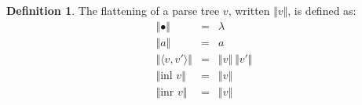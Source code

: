 \documentclass[oneside,12pt]{scrbook}
\theoremstyle{definition}
\theoremstyle{plain}
\theoremstyle{definition}
\newtheorem{Definition}{Definition}
\begin{document}
\begin{Definition}
   The flattening of a parse tree $v$, written $\Vert v \Vert$, is defined as:
   \[
       \begin{array}{lcl}
         \Vert \bullet \Vert               & = & \lambda \\
         \Vert a       \Vert               & = & a \\
         \Vert\langle v , v' \rangle \Vert & = & \Vert v \Vert\:\Vert v' \Vert \\
         \Vert\text{inl }v\Vert            & = & \Vert v \Vert \\
         \Vert\text{inr }v\Vert            & = & \Vert v \Vert \\
       \end{array}
   \]
\end{Definition}
\end{document}
